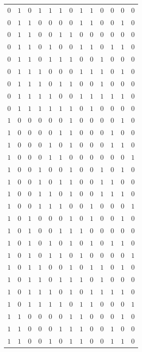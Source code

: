 \documentclass [15pt,a4paper,twoside]{article}
\begin{document}
\begin{center}
\begin{tabular}{cccccc|ccccccc}
$0$&$1$&$0$&$1$&$1$&$1$&$0$&$1$&$1$&$0$&$0$&$0$&$0$\\
$0$&$1$&$1$&$0$&$0$&$0$&$0$&$1$&$1$&$0$&$0$&$1$&$0$\\
$0$&$1$&$1$&$0$&$0$&$1$&$1$&$0$&$0$&$0$&$0$&$0$&$0$\\
$0$&$1$&$1$&$0$&$1$&$0$&$0$&$1$&$1$&$0$&$1$&$1$&$0$\\
$0$&$1$&$1$&$0$&$1$&$1$&$1$&$0$&$0$&$1$&$0$&$0$&$0$\\
$0$&$1$&$1$&$1$&$0$&$0$&$0$&$1$&$1$&$1$&$0$&$1$&$0$\\
$0$&$1$&$1$&$1$&$0$&$1$&$1$&$0$&$0$&$1$&$0$&$0$&$0$\\
$0$&$1$&$1$&$1$&$1$&$0$&$0$&$1$&$1$&$1$&$1$&$1$&$0$\\
$0$&$1$&$1$&$1$&$1$&$1$&$1$&$0$&$1$&$0$&$0$&$0$&$0$\\
$1$&$0$&$0$&$0$&$0$&$0$&$1$&$0$&$0$&$0$&$0$&$1$&$0$\\
$1$&$0$&$0$&$0$&$0$&$1$&$1$&$0$&$0$&$0$&$1$&$0$&$0$\\
$1$&$0$&$0$&$0$&$1$&$0$&$1$&$0$&$0$&$0$&$1$&$1$&$0$\\
$1$&$0$&$0$&$0$&$1$&$1$&$0$&$0$&$0$&$0$&$0$&$0$&$1$\\
$1$&$0$&$0$&$1$&$0$&$0$&$1$&$0$&$0$&$1$&$0$&$1$&$0$\\
$1$&$0$&$0$&$1$&$0$&$1$&$1$&$0$&$0$&$1$&$1$&$0$&$0$\\
$1$&$0$&$0$&$1$&$1$&$0$&$1$&$0$&$0$&$1$&$1$&$1$&$0$\\
$1$&$0$&$0$&$1$&$1$&$1$&$0$&$0$&$1$&$0$&$0$&$0$&$1$\\
$1$&$0$&$1$&$0$&$0$&$0$&$1$&$0$&$1$&$0$&$0$&$1$&$0$\\
$1$&$0$&$1$&$0$&$0$&$1$&$1$&$1$&$0$&$0$&$0$&$0$&$0$\\
$1$&$0$&$1$&$0$&$1$&$0$&$1$&$0$&$1$&$0$&$1$&$1$&$0$\\
$1$&$0$&$1$&$0$&$1$&$1$&$0$&$1$&$0$&$0$&$0$&$0$&$1$\\
$1$&$0$&$1$&$1$&$0$&$0$&$1$&$0$&$1$&$1$&$0$&$1$&$0$\\
$1$&$0$&$1$&$1$&$0$&$1$&$1$&$1$&$0$&$1$&$0$&$0$&$0$\\
$1$&$0$&$1$&$1$&$1$&$0$&$1$&$0$&$1$&$1$&$1$&$1$&$0$\\
$1$&$0$&$1$&$1$&$1$&$1$&$0$&$1$&$1$&$0$&$0$&$0$&$1$\\
$1$&$1$&$0$&$0$&$0$&$0$&$1$&$1$&$0$&$0$&$0$&$1$&$0$\\
$1$&$1$&$0$&$0$&$0$&$1$&$1$&$1$&$0$&$0$&$1$&$0$&$0$\\
$1$&$1$&$0$&$0$&$1$&$0$&$1$&$1$&$0$&$0$&$1$&$1$&$0$\\

\end{tabular}
\end{center}
\end{document}
